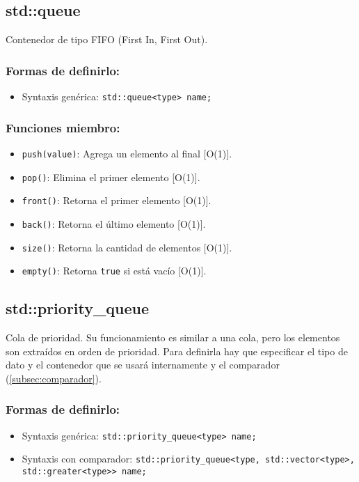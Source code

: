\subsection{std::queue}
\label{subsec:std_queue}
Contenedor de tipo FIFO (First In, First Out). 

\subsubsection{Formas de definirlo:}
\begin{itemize}
  \item Syntaxis genérica: \texttt{std::queue<type> name;}
\end{itemize}

\subsubsection{Funciones miembro:}
\begin{itemize}
  \item \texttt{push(value)}: Agrega un elemento al final [O(1)].
  \item \texttt{pop()}: Elimina el primer elemento [O(1)].
  \item \texttt{front()}: Retorna el primer elemento [O(1)].
  \item \texttt{back()}: Retorna el último elemento [O(1)].
  \item \texttt{size()}: Retorna la cantidad de elementos [O(1)].
  \item \texttt{empty()}: Retorna \texttt{true} si está vacío [O(1)]. 
\end{itemize}

\subsection{std::priority\_queue}
\label{subsec:std_priority_queue}
Cola de prioridad. Su funcionamiento es similar a una cola, pero los elementos son extraídos en orden de prioridad. Para definirla hay que especificar el tipo de dato y el contenedor que se usará internamente y el comparador (\ref{subsec:comparador}).

\subsubsection{Formas de definirlo:}
\begin{itemize}
  \item Syntaxis genérica: \texttt{std::priority\_queue<type> name;}
  \item Syntaxis con comparador: \texttt{std::priority\_queue<type, std::vector<type>, std::greater<type>> name;}
\end{itemize}

